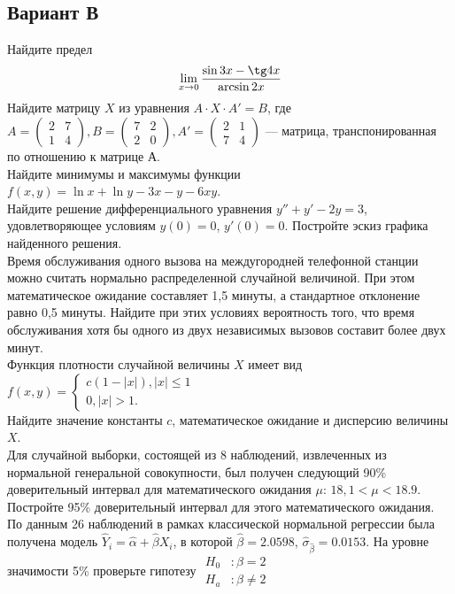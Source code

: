 \documentclass[addpoints, answers]{exam} %
\begin{document}
\subsection{Вариант В}
\begin{questions}
\question Найдите предел
\[
\lim_{x\to 0} \frac{\sin 3x-\tg 4x}{\arcsin 2x}
\]
\question Найдите матрицу $X$ из уравнения $A\cdot X\cdot A'=B$, где $A=\left(\begin{array}{cc}
2 & 7\\
1 & 4
\end{array}\right), B=\left(\begin{array}{cc}
7 & 2\\
2 & 0
\end{array}\right), A'=\left(\begin{array}{cc}
2 & 1\\
7 & 4
\end{array}\right)$ --- матрица, транспонированная по отношению к матрице А.\\
\question Найдите минимумы и максимумы функции $f(x,y)=\ln x+\ln y-3x-y-6xy$.\\
\question Найдите решение дифференциального уравнения $y''+y'-2y=3$, удовлетворяющее условиям $y(0)=0$, $y'(0)=0$. Постройте эскиз графика найденного решения.\\
\question Время обслуживания одного вызова на междугородней телефонной станции можно считать нормально распределенной случайной величиной. При этом математическое ожидание составляет 1,5 минуты, а стандартное отклонение равно 0,5 минуты. Найдите при этих условиях вероятность того, что время обслуживания хотя бы одного из двух независимых вызовов составит более двух минут.\\
\question Функция плотности случайной величины $X$ имеет вид\\
$f(x,y)=\begin{cases}
c(1-|x|), |x|\leq 1\\
0, |x|>1.
\end{cases}$\\
Найдите значение константы $c$, математическое ожидание и дисперсию величины $X$.\\
\question Для случайной выборки, состоящей из 8 наблюдений, извлеченных из нормальной генеральной совокупности, был получен следующий 90\% доверительный интервал для математического ожидания $\mu$: $18,1<\mu< 18.9$. Постройте 95\% доверительный интервал для этого математического ожидания.\\
\question По данным 26 наблюдений в рамках классической нормальной регрессии была получена модель $\hat{Y}_i=\hat{\alpha}+\hat{\beta}X_i$, в которой $\hat{\beta}=2.0598$, $\hat{\sigma}_{\hat{\beta}}=0.0153$. На уровне значимости 5\% проверьте гипотезу
$\begin{aligned}
H_0&: \beta=2\\
H_a&: \beta\ne 2
\end{aligned}$
\end{questions}
\end{document}
